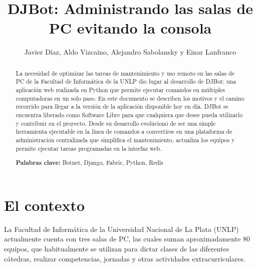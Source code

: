 \documentclass[runningheads,a4paper,titlepage]{llncs}
\newcommand{\keywords}[1]{\par\addvspace\baselineskip
\noindent\keywordname\enspace\ignorespaces#1}
\begin{document}
\begin{titlepage}

\title{DJBot: Administrando las salas de PC evitando la consola}


\author{Javier Díaz, Aldo Vizcaino, Alejandro Sabolansky y Einar Lanfranco}

\maketitle


\begin{abstract}
La necesidad de optimizar las tareas de mantenimiento y uso remoto en las salas
de PC de la Facultad de Inform\'atica de la UNLP dio lugar al desarrollo de DJBot:
una aplicaci\'on web realizada en Python que permite ejecutar comandos en
m\'ultiples computadoras en un solo paso. 
En este documento se describen los motivos y el camino recorrido para llegar a
la versión de la aplicación disponible hoy en día.
DJBot se encuentra liberado como Software Libre para que cualquiera que desee
pueda utilizarlo y contribuir en el proyecto.
Desde su desarrollo evolucion\'o de ser una simple herramienta ejecutable en 
la l\'inea de comandos a convertirse en una plataforma de administraci\'on
centralizada que simplifica el mantenimiento, actualiza los equipos 
y permite ejecutar tareas programadas en la interfaz web.  

\bigskip 

\noindent \textbf{Palabras clave: } Botnet, Django, Fabric, Python, Redis
\end{abstract}

\end{titlepage}


\section{El contexto}
\noindent La Facultad de Informática de la Universidad Nacional de La Plata (UNLP)
actualmente cuenta con tres salas de PC, las cuales suman aproximadamente 80 equipos, 
que habitualmente se utilizan para dictar clases de las diferentes
c\'atedras, realizar competencias, jornadas y otras actividades extracurriculares. 
\end{document}

